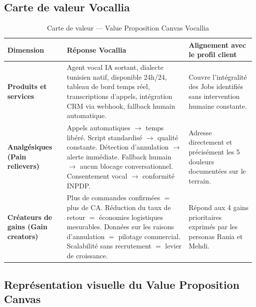 \subsection{Carte de valeur Vocallia}
\label{section3.3.2}

\begin{table}[H]
\centering
\caption{Carte de valeur --- Value Proposition Canvas Vocallia}
\vspace{4pt}
\begin{tabularx}{\textwidth}{|>{\raggedright\arraybackslash}p{2.5cm}|>{\raggedright\arraybackslash}X|>{\raggedright\arraybackslash}X|}
\hline
\textbf{Dimension} & \textbf{Réponse Vocallia} & \textbf{Alignement avec le profil client} \\
\hline
\textbf{Produits et services} & Agent vocal IA sortant, dialecte tunisien natif, disponible 24h/24, tableau de bord temps réel, transcriptions d'appels, intégration CRM via webhook, fallback humain automatique. & Couvre l'intégralité des Jobs identifiés sans intervention humaine constante. \\
\hline
\textbf{Analgésiques (Pain relievers)} & Appels automatiques $\rightarrow$ temps libéré. Script standardisé $\rightarrow$ qualité constante. Détection d'annulation $\rightarrow$ alerte immédiate. Fallback humain $\rightarrow$ aucun blocage conversationnel. Consentement vocal $\rightarrow$ conformité INPDP. & Adresse directement et précisément les 5 douleurs documentées sur le terrain. \\
\hline
\textbf{Créateurs de gains (Gain creators)} & Plus de commandes confirmées $=$ plus de CA. Réduction du taux de retour $=$ économies logistiques mesurables. Données sur les raisons d'annulation $=$ pilotage commercial. Scalabilité sans recrutement $=$ levier de croissance. & Répond aux 4 gains prioritaires exprimés par les personas Rania et Mehdi. \\
\hline
\end{tabularx}
\end{table}

\subsection{Représentation visuelle du Value Proposition Canvas}
\label{section3.3.3}

